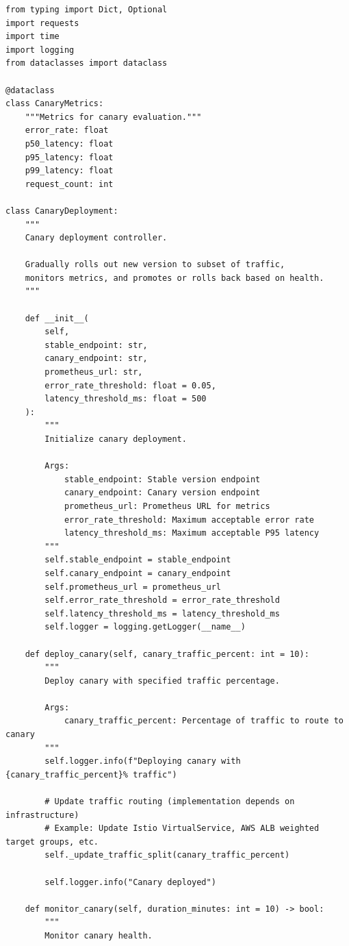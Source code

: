 \begin{lstlisting}[style=python, caption={Canary Deployment Controller}]
from typing import Dict, Optional
import requests
import time
import logging
from dataclasses import dataclass

@dataclass
class CanaryMetrics:
    """Metrics for canary evaluation."""
    error_rate: float
    p50_latency: float
    p95_latency: float
    p99_latency: float
    request_count: int

class CanaryDeployment:
    """
    Canary deployment controller.

    Gradually rolls out new version to subset of traffic,
    monitors metrics, and promotes or rolls back based on health.
    """

    def __init__(
        self,
        stable_endpoint: str,
        canary_endpoint: str,
        prometheus_url: str,
        error_rate_threshold: float = 0.05,
        latency_threshold_ms: float = 500
    ):
        """
        Initialize canary deployment.

        Args:
            stable_endpoint: Stable version endpoint
            canary_endpoint: Canary version endpoint
            prometheus_url: Prometheus URL for metrics
            error_rate_threshold: Maximum acceptable error rate
            latency_threshold_ms: Maximum acceptable P95 latency
        """
        self.stable_endpoint = stable_endpoint
        self.canary_endpoint = canary_endpoint
        self.prometheus_url = prometheus_url
        self.error_rate_threshold = error_rate_threshold
        self.latency_threshold_ms = latency_threshold_ms
        self.logger = logging.getLogger(__name__)

    def deploy_canary(self, canary_traffic_percent: int = 10):
        """
        Deploy canary with specified traffic percentage.

        Args:
            canary_traffic_percent: Percentage of traffic to route to canary
        """
        self.logger.info(f"Deploying canary with {canary_traffic_percent}% traffic")

        # Update traffic routing (implementation depends on infrastructure)
        # Example: Update Istio VirtualService, AWS ALB weighted target groups, etc.
        self._update_traffic_split(canary_traffic_percent)

        self.logger.info("Canary deployed")

    def monitor_canary(self, duration_minutes: int = 10) -> bool:
        """
        Monitor canary health.


\end{lstlisting}
